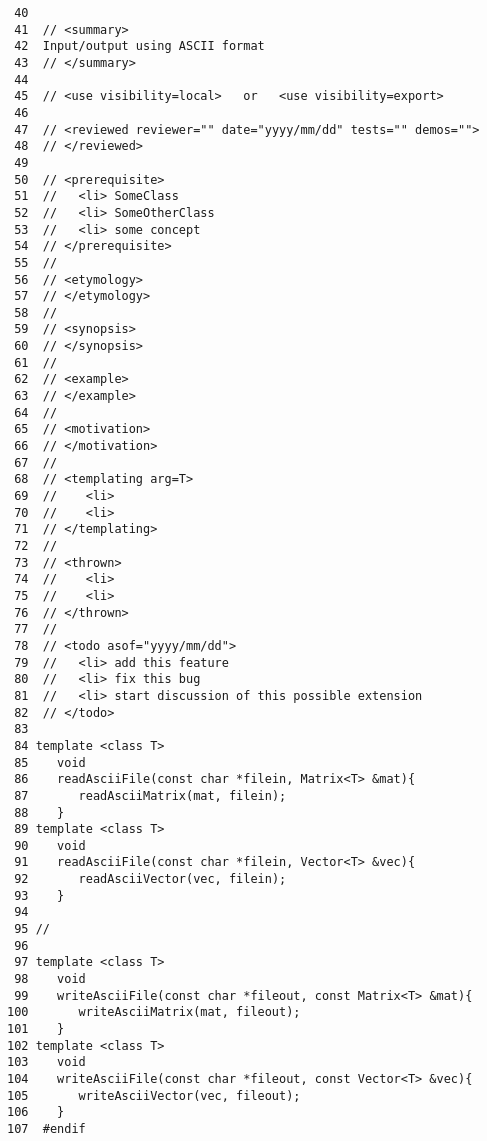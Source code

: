 \begin{verbatim}
 40
 41  // <summary>
 42  Input/output using ASCII format
 43  // </summary>
 44
 45  // <use visibility=local>   or   <use visibility=export>
 46
 47  // <reviewed reviewer="" date="yyyy/mm/dd" tests="" demos="">
 48  // </reviewed>
 49
 50  // <prerequisite>
 51  //   <li> SomeClass
 52  //   <li> SomeOtherClass
 53  //   <li> some concept
 54  // </prerequisite>
 55  //
 56  // <etymology>
 57  // </etymology>
 58  //
 59  // <synopsis>
 60  // </synopsis>
 61  //
 62  // <example>
 63  // </example>
 64  //
 65  // <motivation>
 66  // </motivation>
 67  //
 68  // <templating arg=T>
 69  //    <li>
 70  //    <li>
 71  // </templating>
 72  //
 73  // <thrown>
 74  //    <li>
 75  //    <li>
 76  // </thrown>
 77  //
 78  // <todo asof="yyyy/mm/dd">
 79  //   <li> add this feature
 80  //   <li> fix this bug
 81  //   <li> start discussion of this possible extension
 82  // </todo>
 83
 84 template <class T>
 85    void
 86    readAsciiFile(const char *filein, Matrix<T> &mat){
 87       readAsciiMatrix(mat, filein);
 88    }
 89 template <class T>
 90    void
 91    readAsciiFile(const char *filein, Vector<T> &vec){
 92       readAsciiVector(vec, filein);
 93    }
 94 
 95 //
 96 
 97 template <class T>
 98    void
 99    writeAsciiFile(const char *fileout, const Matrix<T> &mat){
100       writeAsciiMatrix(mat, fileout);
101    }
102 template <class T>
103    void
104    writeAsciiFile(const char *fileout, const Vector<T> &vec){
105       writeAsciiVector(vec, fileout);
106    }
107  #endif
\end{verbatim}

